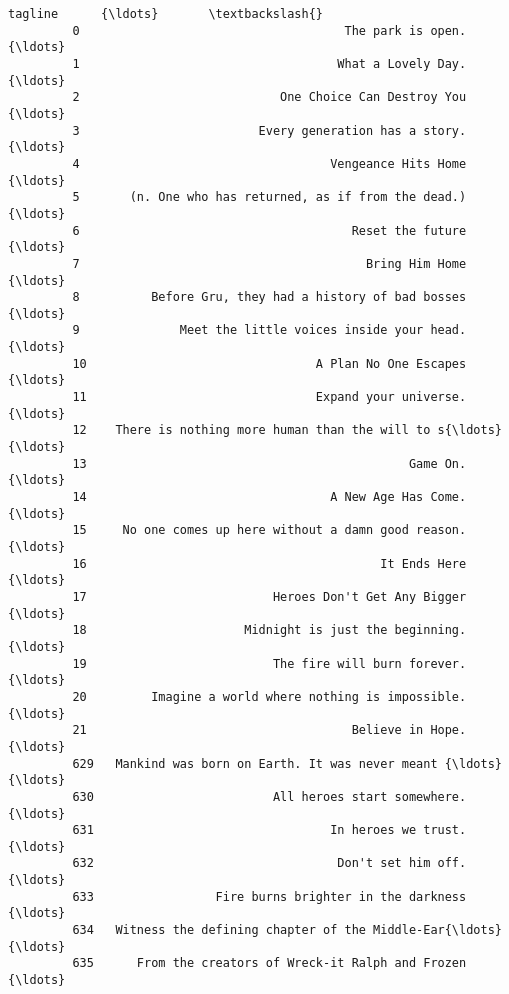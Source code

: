 \documentclass[11pt]{article}
\begin{document}
\begin{Verbatim}[commandchars=\\\{\}]
                                                         tagline      {\ldots}       \textbackslash{}
         0                                     The park is open.      {\ldots}        
         1                                    What a Lovely Day.      {\ldots}        
         2                            One Choice Can Destroy You      {\ldots}        
         3                         Every generation has a story.      {\ldots}        
         4                                   Vengeance Hits Home      {\ldots}        
         5       (n. One who has returned, as if from the dead.)      {\ldots}        
         6                                      Reset the future      {\ldots}        
         7                                        Bring Him Home      {\ldots}        
         8          Before Gru, they had a history of bad bosses      {\ldots}        
         9              Meet the little voices inside your head.      {\ldots}        
         10                                A Plan No One Escapes      {\ldots}        
         11                                Expand your universe.      {\ldots}        
         12    There is nothing more human than the will to s{\ldots}      {\ldots}        
         13                                             Game On.      {\ldots}        
         14                                  A New Age Has Come.      {\ldots}        
         15     No one comes up here without a damn good reason.      {\ldots}        
         16                                         It Ends Here      {\ldots}        
         17                          Heroes Don't Get Any Bigger      {\ldots}        
         18                      Midnight is just the beginning.      {\ldots}        
         19                          The fire will burn forever.      {\ldots}        
         20         Imagine a world where nothing is impossible.      {\ldots}        
         21                                     Believe in Hope.      {\ldots}        
         629   Mankind was born on Earth. It was never meant {\ldots}      {\ldots}        
         630                         All heroes start somewhere.      {\ldots}        
         631                                 In heroes we trust.      {\ldots}        
         632                                  Don't set him off.      {\ldots}        
         633                 Fire burns brighter in the darkness      {\ldots}        
         634   Witness the defining chapter of the Middle-Ear{\ldots}      {\ldots}        
         635      From the creators of Wreck-it Ralph and Frozen      {\ldots}        

\end{Verbatim}
\end{document}
